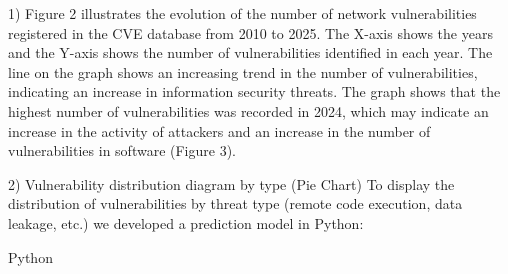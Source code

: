 \begin{multicols}{2}
1) Figure 2 illustrates the evolution of the number of network
vulnerabilities registered in the CVE database from 2010 to 2025. The
X-axis shows the years and the Y-axis shows the number of
vulnerabilities identified in each year. The line on the graph shows
an increasing trend in the number of vulnerabilities, indicating an
increase in information security threats. The graph shows that the
highest number of vulnerabilities was recorded in 2024, which may
indicate an increase in the activity of attackers and an increase in
the number of vulnerabilities in software (Figure 3).

2) Vulnerability distribution diagram by type (Pie Chart)
To display the distribution of vulnerabilities by threat type (remote
code execution, data leakage, etc.) we developed a prediction model in
Python:
\end{multicols}

Python

